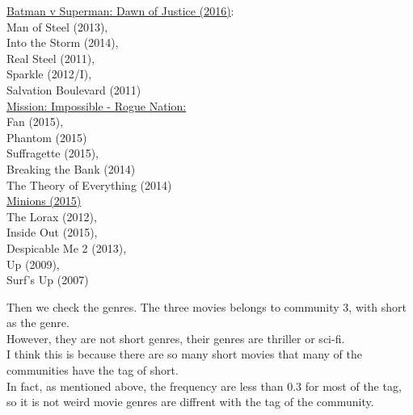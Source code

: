 \documentclass{article}
\begin{document}
\underline{ Batman v Superman: Dawn of Justice (2016)}:\\
Man of Steel (2013), \\
Into the Storm (2014),\\
Real Steel (2011), \\
Sparkle (2012/I),\\
Salvation Boulevard (2011)\\

\underline {Mission: Impossible - Rogue Nation:}\\
Fan (2015),\\
Phantom (2015)\\
Suffragette (2015), \\Breaking the Bank (2014)\\
The Theory of Everything (2014)\\

\underline{Minions (2015)}\\
The Lorax (2012),\\ Inside Out (2015),\\
Despicable Me 2 (2013), \\Up (2009),\\
Surf’s Up (2007)

Then we check the genres. The three movies belongs to community 3, with short as the genre.\\
However, they are not short genres, their genres are thriller or sci-fi.\\
I think this is because there are so many short movies that many of the communities have the tag of short. \\
In fact, as mentioned above, the frequency are less than 0.3 for most of the tag, so it is not weird movie genres are diffrent with the tag of the community.
\end{document}
